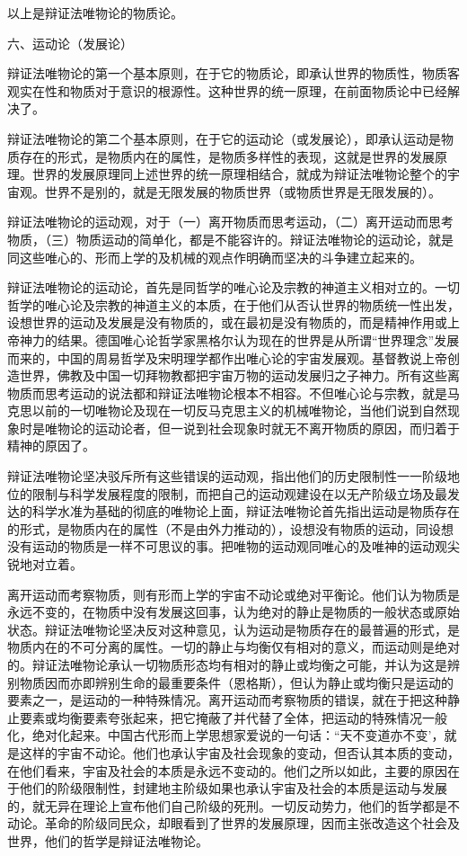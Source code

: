 以上是辩证法唯物论的物质论。

六、运动论（发展论）

辩证法唯物论的第一个基本原则，在于它的物质论，即承认世界的物质性，物质客观实在性和物质对于意识的根源性。这种世界的统一原理，在前面物质论中已经解决了。

辩证法唯物论的第二个基本原则，在于它的运动论（或发展论），即承认运动是物质存在的形式，是物质内在的属性，是物质多样性的表现，这就是世界的发展原理。世界的发展原理同上述世界的统一原理相结合，就成为辩证法唯物论整个的宇宙观。世界不是别的，就是无限发展的物质世界（或物质世界是无限发展的）。

辩证法唯物论的运动观，对于（一）离开物质而思考运动，（二）离开运动而思考物质，（三）物质运动的简单化，都是不能容许的。辩证法唯物论的运动论，就是同这些唯心的、形而上学的及机械的观点作明确而坚决的斗争建立起来的。

辩证法唯物论的运动论，首先是同哲学的唯心论及宗教的神道主义相对立的。一切哲学的唯心论及宗教的神道主义的本质，在于他们从否认世界的物质统一性出发，设想世界的运动及发展是没有物质的，或在最初是没有物质的，而是精神作用或上帝神力的结果。德国唯心论哲学家黑格尔认为现在的世界是从所谓“世界理念”发展而来的，中国的周易哲学及宋明理学都作出唯心论的宇宙发展观。基督教说上帝创造世界，佛教及中国一切拜物教都把宇宙万物的运动发展归之子神力。所有这些离物质而思考运动的说法都和辩证法唯物论根本不相容。不但唯心论与宗教，就是马克思以前的一切唯物论及现在一切反马克思主义的机械唯物论，当他们说到自然现象时是唯物论的运动论者，但一说到社会现象时就无不离开物质的原因，而归着于精神的原因了。

辩证法唯物论坚决驳斥所有这些错误的运动观，指出他们的历史限制性一一阶级地位的限制与科学发展程度的限制，而把自己的运动观建设在以无产阶级立场及最发达的科学水准为基础的彻底的唯物论上面，辩证法唯物论首先指出运动是物质存在的形式，是物质内在的属性（不是由外力推动的），设想没有物质的运动，同设想没有运动的物质是一样不可思议的事。把唯物的运动观同唯心的及唯神的运动观尖锐地对立着。

离开运动而考察物质，则有形而上学的宇宙不动论或绝对平衡论。他们认为物质是永远不变的，在物质中没有发展这回事，认为绝对的静止是物质的一般状态或原始状态。辩证法唯物论坚决反对这种意见，认为运动是物质存在的最普遍的形式，是物质内在的不可分离的属性。一切的静止与均衡仅有相对的意义，而运动则是绝对的。辩证法唯物论承认一切物质形态均有相对的静止或均衡之可能，并认为这是辨别物质因而亦即辨别生命的最重要条件（恩格斯），但认为静止或均衡只是运动的要素之一，是运动的一种特殊情况。离开运动而考察物质的错误，就在于把这种静止要素或均衡要素夸张起来，把它掩蔽了并代替了全体，把运动的特殊情况一般化，绝对化起来。中国古代形而上学思想家爱说的一句话：“天不变道亦不变’，就是这样的宇宙不动论。他们也承认宇宙及社会现象的变动，但否认其本质的变动，在他们看来，宇宙及社会的本质是永远不变动的。他们之所以如此，主要的原因在于他们的阶级限制性，封建地主阶级如果也承认宇宙及社会的本质是运动与发展的，就无异在理论上宣布他们自己阶级的死刑。一切反动势力，他们的哲学都是不动论。革命的阶级同民众，却眼看到了世界的发展原理，因而主张改造这个社会及世界，他们的哲学是辩证法唯物论。

